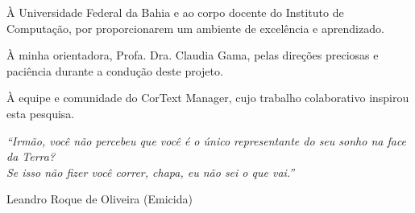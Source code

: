 \documentclass[
	oneside,
	a4paper,
	12pt,
	chapter=TITLE,
	section=TITLE,
	english,
	brazilian
]{abntex2}
\begin{document}
\begin{agradecimentos}
À Universidade Federal da Bahia e ao corpo docente do Instituto de Computação, por proporcionarem um ambiente de excelência e aprendizado.

À minha orientadora, Profa. Dra. Claudia Gama, pelas direções preciosas e paciência durante a condução deste projeto.

À equipe e comunidade do CorText Manager, cujo trabalho colaborativo inspirou esta pesquisa.
\end{agradecimentos}


\begin{epigrafe}
  \vspace*{\fill}
  \begin{flushright}
    \SingleSpacing\fontsize{11}{13}\selectfont
    \textit{``Irmão, você não percebeu que você é o único representante do seu sonho na face da Terra?\\
    Se isso não fizer você correr, chapa, eu não sei o que vai.''}\par
    \vspace{0.5cm}
    Leandro Roque de Oliveira (Emicida)
  \end{flushright}
  \vspace*{2cm}
\end{epigrafe}
\end{document}
